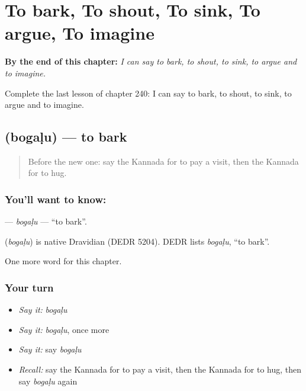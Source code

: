 
\chapter{To bark, To shout, To sink, To argue, To imagine}
\label{ch:ka-to-bark-to-shout-to-sink-to-argue-to-imagine}

\begin{chapteropening}
\textbf{By the end of this chapter:} \emph{I can say to bark, to shout, to sink, to argue and to imagine.}

Complete the last lesson of chapter 240: I can say to bark, to shout, to sink, to argue and to imagine.
\end{chapteropening}

\section[\texorpdfstring{\kn{ಬೊಗಳು} (bogaḷu)}{ಬೊಗಳು (bogaḷu)}]{ (bogaḷu) — to bark}

\label{lesson:KA-C240-bogalu}



\begin{quote}
Before the new one: say the Kannada for to pay a visit, then the Kannada for to hug.
\end{quote}

\subsection*{You'll want to know: }
\textbf{} — \emph{bogaḷu} — \textquotedblleft{}to bark\textquotedblright{}.

\begin{cousinweb}
\textbf{} (\emph{bogaḷu}) is native Dravidian (DEDR 5204). DEDR lists \emph{bogaḷu}, \textquotedblleft{}to bark\textquotedblright{}.
\end{cousinweb}

\begin{grammarlens}[title={What you've built}]
One more word for this chapter.
\end{grammarlens}

\subsection*{Your turn}
\begin{itemize}
\raggedright
  \item \emph{Say it:} \emph{bogaḷu}
  \item \emph{Say it:} \emph{bogaḷu}, once more
  \item \emph{Say it:} say \emph{bogaḷu}
  \item \emph{Recall:} say the Kannada for to pay a visit, then the Kannada for to hug, then say \emph{bogaḷu} again
\end{itemize}

